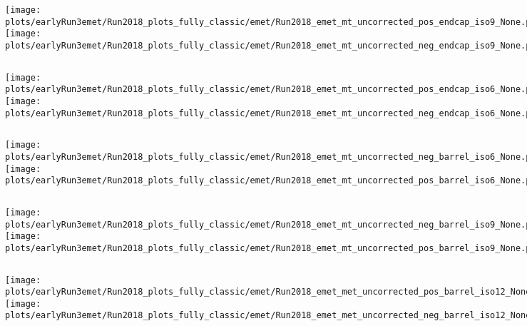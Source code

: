 \documentclass[en,16:9,navbarinfooter]{presentation/sdqbeamer}
\begin{document}
\begin{frame}{\insertsubsection}
   \begin{columns}
   \texttt{[image: plots/earlyRun3emet/Run2018\_plots\_fully\_classic/emet/Run2018\_emet\_mt\_uncorrected\_pos\_endcap\_iso9\_None.png]}
   \texttt{[image: plots/earlyRun3emet/Run2018\_plots\_fully\_classic/emet/Run2018\_emet\_mt\_uncorrected\_neg\_endcap\_iso9\_None.png]}
\end{columns}
\end{frame}

\begin{frame}{\insertsubsection}
   \begin{columns}
   \texttt{[image: plots/earlyRun3emet/Run2018\_plots\_fully\_classic/emet/Run2018\_emet\_mt\_uncorrected\_pos\_endcap\_iso6\_None.png]}
   \texttt{[image: plots/earlyRun3emet/Run2018\_plots\_fully\_classic/emet/Run2018\_emet\_mt\_uncorrected\_neg\_endcap\_iso6\_None.png]}
\end{columns}
\end{frame}

\begin{frame}{\insertsubsection}
   \begin{columns}
   \texttt{[image: plots/earlyRun3emet/Run2018\_plots\_fully\_classic/emet/Run2018\_emet\_mt\_uncorrected\_neg\_barrel\_iso6\_None.png]}
   \texttt{[image: plots/earlyRun3emet/Run2018\_plots\_fully\_classic/emet/Run2018\_emet\_mt\_uncorrected\_pos\_barrel\_iso6\_None.png]}
\end{columns}
\end{frame}

\begin{frame}{\insertsubsection}
   \begin{columns}
   \texttt{[image: plots/earlyRun3emet/Run2018\_plots\_fully\_classic/emet/Run2018\_emet\_mt\_uncorrected\_neg\_barrel\_iso9\_None.png]}
   \texttt{[image: plots/earlyRun3emet/Run2018\_plots\_fully\_classic/emet/Run2018\_emet\_mt\_uncorrected\_pos\_barrel\_iso9\_None.png]}
\end{columns}
\end{frame}

\begin{frame}{\insertsubsection}
   \begin{columns}
   \texttt{[image: plots/earlyRun3emet/Run2018\_plots\_fully\_classic/emet/Run2018\_emet\_met\_uncorrected\_pos\_barrel\_iso12\_None.png]}
   \texttt{[image: plots/earlyRun3emet/Run2018\_plots\_fully\_classic/emet/Run2018\_emet\_met\_uncorrected\_neg\_barrel\_iso12\_None.png]}
\end{columns}
\end{frame}
\end{document}
